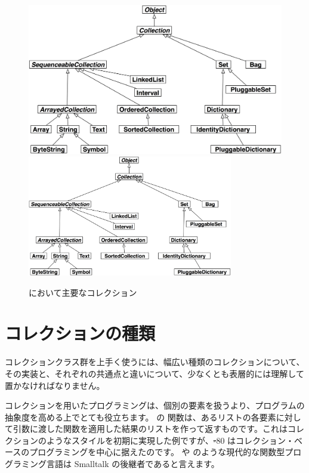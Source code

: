 \documentclass[a4paper,10pt,twoside]{book}
\begin{document}
\begin{figure}
\begin{center}
\ifluluelse
	{\includegraphics[width=\textwidth]{CollectionHierarchy}}
	{\includegraphics[width=0.8\textwidth]{CollectionHierarchy}}
\caption{\pharo において主要なコレクション}
\end{center}
\end{figure}

\section{コレクションの種類}

コレクションクラス群を上手く使うには、幅広い種類のコレクションについて、その実装と、それぞれの共通点と違いについて、少なくとも表層的には理解して置かなければなりません。

コレクションを用いたプログラミングは、個別の要素を扱うより、プログラムの抽象度を高める上でとても役立ちます。
 の  関数は、あるリストの各要素に対して引数に渡した関数を適用した結果のリストを作って返すものです。これはコレクションのようなスタイルを初期に実現した例ですが、\st-80 はコレクション・ベースのプログラミングを中心に据えたのです。 や  のような現代的な関数型プログラミング言語は Smalltalk の後継者であると言えます。
\end{document}
